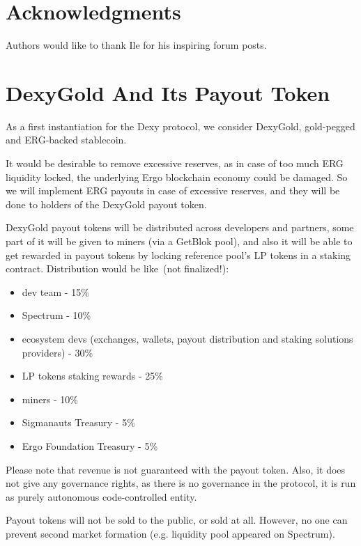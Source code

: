 \documentclass{article}   %
\begin{document}
\section*{Acknowledgments}

Authors would like to thank Ile for his inspiring forum posts.

\section*{DexyGold And Its Payout Token}

As a first instantiation for the Dexy protocol, we consider DexyGold, gold-pegged and ERG-backed stablecoin. 

It would be desirable to remove excessive reserves, as in case of too much ERG liquidity locked, the underlying Ergo blockchain economy
could be damaged. So we will implement ERG payouts in case of excessive reserves, and they will be done to holders of the DexyGold payout token. 

DexyGold payout tokens will be distributed across developers and partners, some part of it will be given to miners (via a GetBlok pool), 
and also it will be able to get rewarded in payout tokens by locking reference pool's LP tokens in a staking contract.
Distribution would be like~(not finalized!):

\begin{itemize}
\item{dev team} - 15\%
\item{Spectrum} - 10\%
\item{ecosystem devs (exchanges, wallets, payout distribution and staking solutions providers)} - 30\%
\item{LP tokens staking rewards} - 25\%
\item{miners} - 10\%
\item{Sigmanauts Treasury} - 5\%
\item{Ergo Foundation Treasury} - 5\%
\end{itemize}


Please note that revenue is not guaranteed with the payout token. Also, it does not give any governance rights, as there is no governance in the protocol, it is run as purely autonomous code-controlled entity. 

Payout tokens will not be sold to the public, or sold at all. However, no one can prevent second market formation (e.g. liquidity pool appeared on Spectrum).







%
\end{document}
